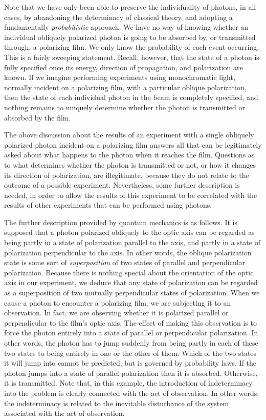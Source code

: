 Note that we have only been able to preserve the individuality of photons,
in all cases, by abandoning the determinacy of classical theory, and
adopting a fundamentally {\em probabilistic}\/ approach. We have no
way of knowing whether an individual obliquely polarized photon is going to
be absorbed by, or transmitted through, a polarizing film. We only know the
probability of each event occurring. This is a fairly sweeping statement. Recall, however, that the state of a photon is fully specified once its energy, direction
of propagation, and polarization are known. If we imagine performing experiments
using monochromatic light, normally incident on a polarizing film, with a
particular oblique polarization, then the state of each individual photon
in the beam is completely specified, and nothing remains to
uniquely
determine whether the photon is transmitted or absorbed by the film. 

The above discussion about the results of an experiment with a single
obliquely polarized photon incident on a polarizing film answers all that can
be legitimately asked about what happens to the photon when it reaches the
film. Questions as to what determines whether the photon is transmitted
or not, or how it changes its direction of polarization, are illegitimate, because 
they do not relate to the outcome of a possible experiment. Nevertheless, some further description
is needed, in order to allow the results of this experiment to be correlated
with the results of other experiments that can be performed using photons. 

The further description provided by quantum mechanics is as follows. It is
supposed that a photon polarized obliquely to the optic axis can be regarded 
as being partly in a state of polarization parallel to the axis, and partly
in a state of polarization perpendicular to the axis. In other words, the 
oblique polarization state is some sort of {\em superposition}\/ of two
states of parallel and perpendicular polarization. Because there is nothing special
about the orientation of the optic axis in our experiment, we deduce 
that any state of polarization can be regarded as a superposition of two
mutually perpendicular states of polarization. When we cause a photon to encounter a polarizing film, we are subjecting it to
an observation. In fact, we are observing whether it is polarized 
parallel or perpendicular to the film's optic axis. The effect of making this observation
is to force the photon entirely into a state of parallel or perpendicular
polarization. In other words, the photon has to jump suddenly from being partly
in each of these two states to being entirely in one or the other of them. Which
of the two states it will jump into cannot be predicted, but is governed
by probability laws. If the photon jumps into a state of parallel polarization then it
is absorbed. Otherwise, it is transmitted. Note that, in this example, the introduction
of 
indeterminacy into the problem  is clearly connected with the act of
observation.  In other words, the indeterminacy is related to the
inevitable disturbance of the system associated with the act of observation. 

